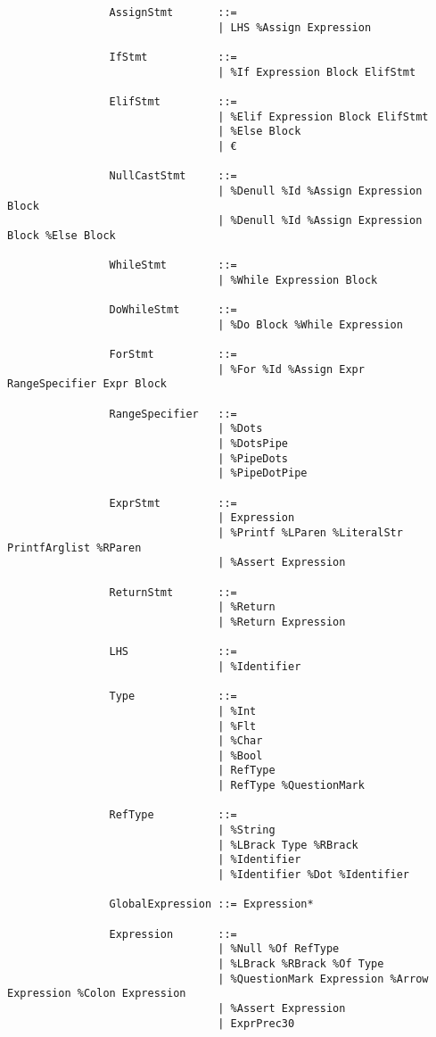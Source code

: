 \documentclass{article}
\begin{document}
\begin{verbatim}
				AssignStmt       ::=
				                 | LHS %Assign Expression
				                 
				IfStmt           ::=
				                 | %If Expression Block ElifStmt
				                 
				ElifStmt         ::=
				                 | %Elif Expression Block ElifStmt
				                 | %Else Block
				                 | €
				                 
				NullCastStmt     ::=
				                 | %Denull %Id %Assign Expression Block
				                 | %Denull %Id %Assign Expression Block %Else Block
				                 
				WhileStmt        ::=
				                 | %While Expression Block
				
				DoWhileStmt      ::=
				                 | %Do Block %While Expression
				                 
				ForStmt          ::=
				                 | %For %Id %Assign Expr RangeSpecifier Expr Block
				                 
				RangeSpecifier   ::=
				                 | %Dots
				                 | %DotsPipe
				                 | %PipeDots
				                 | %PipeDotPipe
				                 
				ExprStmt         ::=
				                 | Expression
				                 | %Printf %LParen %LiteralStr PrintfArglist %RParen
				                 | %Assert Expression
				                 
				ReturnStmt       ::=
				                 | %Return
				                 | %Return Expression
				                 
				LHS              ::=
				                 | %Identifier
				                 
				Type             ::=
				                 | %Int
				                 | %Flt
				                 | %Char
				                 | %Bool
				                 | RefType
				                 | RefType %QuestionMark
				                 
				RefType          ::=
				                 | %String
				                 | %LBrack Type %RBrack
				                 | %Identifier
				                 | %Identifier %Dot %Identifier
				                 
				GlobalExpression ::= Expression*
			
				Expression       ::=
				                 | %Null %Of RefType
				                 | %LBrack %RBrack %Of Type
				                 | %QuestionMark Expression %Arrow Expression %Colon Expression
 				                 | %Assert Expression
				                 | ExprPrec30
				

\end{verbatim}
\end{document}
